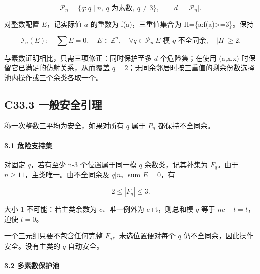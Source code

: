 \[
\mathcal P_n=\{q:q\mid n,\ q\text{ 为素数},\ q\ne3\},
\qquad d=|\mathcal P_n|.
\]

{对整数配置} {\ensuremath{E}，记实际值} {\ensuremath{a}} {的重数为} {f(a)，三重值集合为} {H=\{a:f(a)\textgreater=3\}。保持}

\[
\mathcal I_n(E):\quad \sum E=0,\quad E\in\mathbb Z^n,
\quad \forall q\in\mathcal P_n\ E\text{ 模 }q\text{ 不全同余},
\quad |H|\ge2.
\]

{与素数证明相比，只需三项修正：同时保护至多} {\ensuremath{d}} {个危险集；在使用} {(a,x,x)} {时保留它已满足的仿射关系，从而覆盖} {\ensuremath{q=2}；无同余邻居时按三重值的剩余份数选择池内操作或三个余类各取一个。}

\subsection*{\texorpdfstring{{C33.3} {一般安全引理}}{C33.3 一般安全引理}}\label{C33-h213}

{称一次整数三平均为安全，如果对所有} {\ensuremath{q}} {属于} {\ensuremath{P_{n}}} {都保持不全同余。}

\paragraph*{\texorpdfstring{{3.1} {危险支持集}}{3.1 危险支持集}}\label{C33-h214}

{对固定} {\ensuremath{q}，若有至少} {n-3} {个位置属于同一模} {\ensuremath{q}} {余数类，记其补集为} {\ensuremath{F_{q}}。由于} {\ensuremath{n\ge 11}，主类唯一。由不全同余及} {\ensuremath{q|n}、sum} {\ensuremath{E=0}，有}

\[
2\le |F_q|\le3.
\]

{大小} {1} {不可能：若主类余数为} {\ensuremath{c}、唯一例外为} {c+t，则总和模} {\ensuremath{q}} {等于} {\ensuremath{nc+t=t}，迫使} {\ensuremath{t=0}。}

{一个三元组只要不包含任何完整} {\ensuremath{F_{q}}，未选位置便对每个} {\ensuremath{q}} {仍不全同余，因此操作安全。没有主类的} {\ensuremath{q}} {自动安全。}

\paragraph*{\texorpdfstring{{3.2} {多素数保护池}}{3.2 多素数保护池}}\label{C33-h215}

